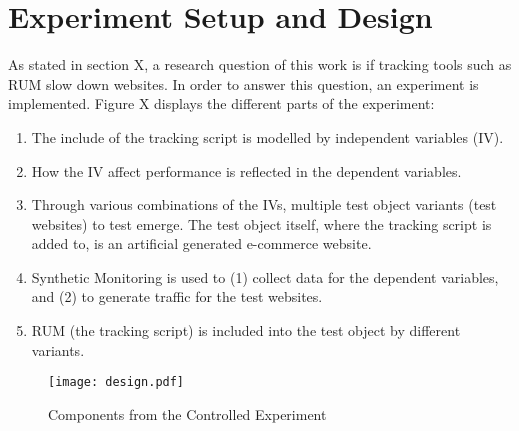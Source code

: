 








\section{Experiment Setup and Design}


As stated in section X, a research question of this work is if tracking tools such as RUM slow down websites.
In order to answer this question, an experiment is implemented.
Figure X displays the different parts of the experiment:

\begin{enumerate}[label=(\alph*)]
\item The include of the tracking script is modelled by independent variables (IV).
\item How the IV affect performance is reflected in the dependent variables.
\item Through various combinations of the IVs, multiple test object variants (test websites) to test emerge. The test object itself, where the tracking script is added to, is an artificial generated e-commerce website.
\item Synthetic Monitoring is used to (1) collect data for the dependent variables, and (2) to generate traffic for the test websites.
\item RUM (the tracking script) is included into the test object by different variants. 
\end{enumerate}


\begin{figure}[h!]
\begin{center}
\texttt{[image: design.pdf]}
\caption{Components from the Controlled Experiment}
\label{figure:design_setup}
\end{center}
\end{figure}

